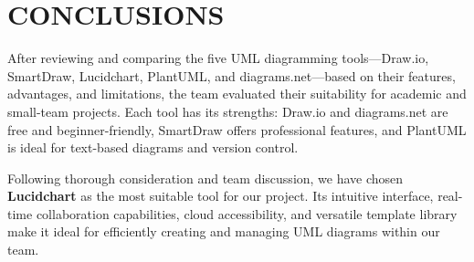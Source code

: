 \chapter{CONCLUSIONS}\label{ch:conclusion}


After reviewing and comparing the five UML diagramming tools—Draw.io, SmartDraw, Lucidchart, PlantUML, and diagrams.net—based on their features, advantages, and limitations, the team evaluated their suitability for academic and small-team projects. Each tool has its strengths: Draw.io and diagrams.net are free and beginner-friendly, SmartDraw offers professional features, and PlantUML is ideal for text-based diagrams and version control. 

Following thorough consideration and team discussion, we have chosen \textbf{Lucidchart} as the most suitable tool for our project. Its intuitive interface, real-time collaboration capabilities, cloud accessibility, and versatile template library make it ideal for efficiently creating and managing UML diagrams within our team.

